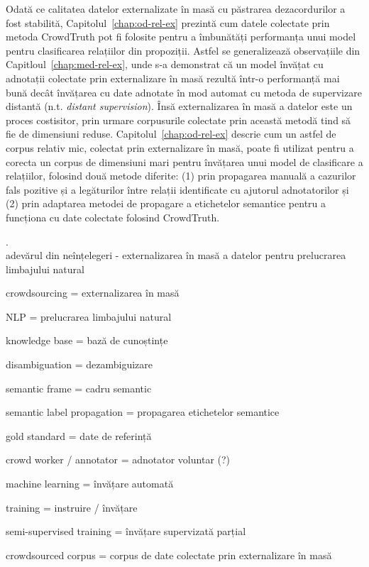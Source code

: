 Odată ce calitatea datelor externalizate în masă cu păstrarea dezacordurilor a fost stabilită, Capitolul~\ref{chap:od-rel-ex} prezintă cum datele colectate prin metoda CrowdTruth pot fi folosite pentru a îmbunătăți performanța unui model pentru clasificarea relațiilor din propoziții. Astfel se generalizează observațiile din Capitloul~\ref{chap:med-rel-ex}, unde s-a demonstrat că un model învățat cu adnotații colectate prin externalizare în masă rezultă într-o performanță mai bună decât învățarea cu date adnotate în mod automat cu metoda de supervizare distantă (n.t. \textit{distant supervision}). Însă externalizarea în masă a datelor este un proces costisitor, prin urmare corpusurile colectate prin această metodă tind să fie de dimensiuni reduse. Capitolul~\ref{chap:od-rel-ex} descrie cum un astfel de corpus relativ mic, colectat prin externalizare în masă, poate fi utilizat pentru a corecta un corpus de dimensiuni mari pentru învățarea unui model de clasificare a relațiilor, folosind două metode diferite: (1) prin propagarea manuală a cazurilor fals pozitive și a legăturilor între relații identificate cu ajutorul adnotatorilor și (2) prin adaptarea metodei de propagare a etichetelor semantice pentru a funcționa cu date colectate folosind CrowdTruth.

. \\

adevărul din neînțelegeri  - externalizarea în masă a datelor pentru prelucrarea limbajului natural

crowdsourcing = externalizarea în masă %

NLP = prelucrarea limbajului natural

knowledge base = bază de cunoștințe

disambiguation = dezambiguizare

semantic frame = cadru semantic %

semantic label propagation = propagarea etichetelor semantice

gold standard = date de referință

crowd worker / annotator = adnotator voluntar (?)

machine learning = învățare automată

training = instruire / învățare

semi-supervised training = învățare supervizată parțial

crowdsourced corpus = corpus de date colectate prin externalizare în masă

